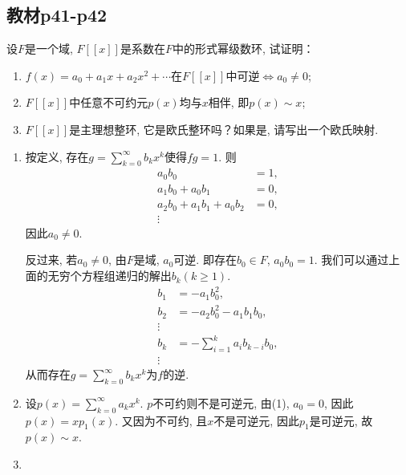 \subsection{教材p41-p42}

\begin{problem}
    设$F$是一个域, $F[[x]]$是系数在$F$中的形式幂级数环, 试证明：
\begin{enumerate}[(1)]
    \item $f(x) = a_0 + a_1x + a_2x^2 + \cdots$在$F[[x]]$中可逆$\Leftrightarrow a_0 \neq 0$;
    \item $F[[x]]$中任意不可约元$p(x)$均与$x$相伴, 即$p(x) \sim x$;
    \item $F[[x]]$是主理想整环, 它是欧氏整环吗？如果是, 请写出一个欧氏映射.
\end{enumerate}
\end{problem}

\begin{solution}
    \begin{enumerate}[(1)]
        \item 按定义, 存在$g = \sum_{k = 0}^{\infty} b_kx^k$使得$fg = 1$. 则
        \[
        \begin{aligned}
            a_0b_0 &= 1,\\
            a_1b_0 + a_0b_1 &= 0,\\
            a_2b_0 + a_1b_1 + a_0b_2 &= 0,\\
            \vdots
        \end{aligned}
        \]
        因此$a_0 \neq 0$.
        
        反过来, 若$a_0 \neq 0$, 由$F$是域, $a_0$可逆. 即存在$b_0 \in F$, $a_0b_0 = 1$. 我们可以通过上面的无穷个方程组递归的解出$b_k(k \geqslant 1)$.
        \[
        \begin{aligned}
            b_1 &= -a_1b_0^2,\\
            b_2 &= -a_2b_0^2 - a_1b_1b_0,\\
            \vdots\\
            b_k &= -\sum_{i = 1}^{k} a_ib_{k - i}b_0,\\
            \vdots
        \end{aligned}
        \]
        从而存在$g = \sum_{k = 0}^{\infty} b_kx^k$为$f$的逆.
        \item 设$p(x) = \sum_{k = 0}^{\infty} a_kx^k$. $p$不可约则不是可逆元, 由(1), $a_0 = 0$, 因此$p(x) = xp_1(x)$. 又因为不可约, 且$x$不是可逆元, 因此$p_1$是可逆元, 故$p(x) \sim x$.
        \item 
    \end{enumerate}
\end{solution}

